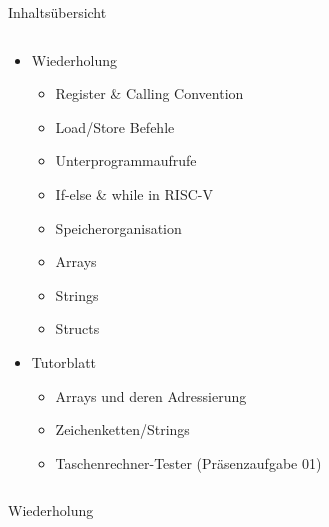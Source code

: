 \documentclass[
  german,            %
  aspectratio=169,    %
]{tumbeamer}
\begin{document}
\begin{frame}[c]{Inhaltsübersicht}{}
  \begin{columns}[c]
    \begin{column}{1\textwidth}
      \begin{itemize}
        \item Wiederholung
        \begin{itemize}
          \item Register \& Calling Convention
          \item Load/Store Befehle
          \item Unterprogrammaufrufe
          \item If-else \& while in RISC-V
          \item Speicherorganisation
          \item Arrays
          \item Strings
          \item Structs
        \end{itemize}
        \item Tutorblatt
        \begin{itemize}
          \item Arrays und deren Adressierung
          \item Zeichenketten/Strings
          \item Taschenrechner-Tester (Präsenzaufgabe 01)
        \end{itemize}
      \end{itemize}
    \end{column}
  \end{columns}
\end{frame}

\begin{frame}[c]{}{}
  \begin{center}
    \LARGE  Wiederholung
  \end{center}
\end{frame}
\end{document}
